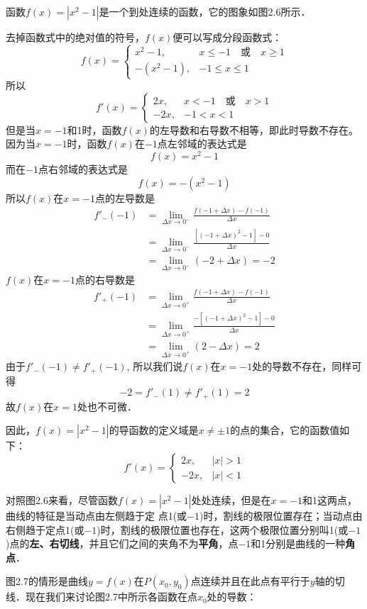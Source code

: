 \begin{solution}
函数$f(x)=|x^2-1|$是一个到处连续的函数，它的图象如图2.6所示．

去掉函数式中的绝对值的符号，$f(x)$便可以写成分段函数式：
\[f(x)=\begin{cases}
    x^2-1,& x\le -1\quad \text{或}\quad x\ge 1\\
    -(x^2-1), & -1\le x\le 1
\end{cases}\]
所以
\[f'(x)=\begin{cases}
    2x ,&  x< -1\quad \text{或}\quad x> 1\\
    -2x,& -1<x<1
\end{cases}\]
但是当$x=-1$和1时，函数$f(x)$的左导数和右导数不相等，即此时导数不存在。因为当$x=-1$时，函数$f(x)$在$-1$点左邻域的表达式是
\[f (x) =x^2-1\]
而在$-1$点右邻域的表达式是
\[f (x) =- (x^2-1)\]
所以$f(x)$在$x=-1$点的左导数是
\[\begin{split}
    f'_-(-1)&=\lim_{\Delta x\to 0^-}\frac{f(-1+\Delta x)-f(-1)}{\Delta x}\\
    &=\lim_{\Delta x\to 0^-}\frac{[(-1+\Delta x)^2-1]-0}{\Delta x}\\
    &=\lim_{\Delta x\to 0^-}(-2+\Delta x)=-2
\end{split}\]
$f(x)$在$x=-1$点的右导数是
\[\begin{split}
    f'_+(-1)&=\lim_{\Delta x\to 0^+}\frac{f(-1+\Delta x)-f(-1)}{\Delta x}\\
    &=\lim_{\Delta x\to 0^+}\frac{-[(-1+\Delta x)^2-1]-0}{\Delta x}\\
    &=\lim_{\Delta x\to 0^+}(2-\Delta x)=2 
\end{split}\]
由于$f'_-(-1)\ne f'_+(-1)$, 所以我们说$f(x)$在$x=-1$处的导数不存在，同样可得
\[-2=f'_- (1)\ne f'_+(1)=2\]
故$f(x)$在$x=1$处也不可微．

因此，$f(x)=|x^2-1|$的导函数的定义域是$x\ne\pm 1$的点的集合，它的函数值如下：
\[f'(x)=\begin{cases}
    2x,& |x|>1\\
    -2x,& |x|<1
\end{cases}\]
\end{solution}

对照图2.6来看，尽管函数$f(x)=|x^2-1|$处处连续，但是在$x=-1$和1这两点，曲线的特征是当动点由左侧趋于定
点1(或$-1$)时，割线的极限位置存在；当动点由右侧趋于定点1(或$-1$)时，割线的极限位置也存在，这两个极限位置分别叫1(或$-1$)点的\textbf{左、右切线}，并且它们之间的夹角不为\textbf{平角}，点$-1$和1分别是曲线的一种\textbf{角点}．
    
图2.7的情形是曲线$y=f(x)$在$P(x_0,y_0)$点连续并且在此点有平行于$y$轴的切线．现在我们来讨论图2.7中所示各函数在点$x_0$处的导数：

